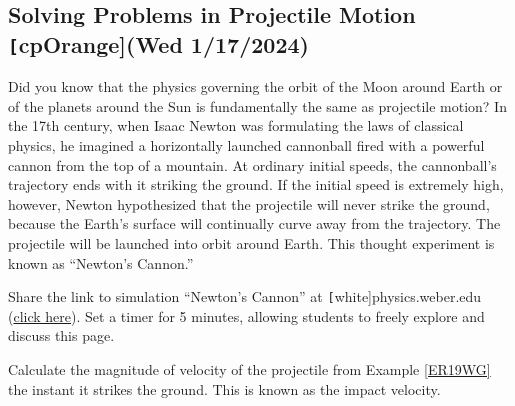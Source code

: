 \documentclass[main-physics.tex]{subfiles}
\begin{document}
\begin{center}
\end{center}

\subsection{Solving Problems in Projectile Motion \texttt[cpOrange]{(Wed 1/17/2024)}} \label{HNMVFe}

\begin{hook}
    Did you know that the physics governing the orbit of the Moon around Earth or of the planets around the Sun is fundamentally the same as projectile motion? In the 17th century, when Isaac Newton was formulating the laws of classical physics, he imagined a horizontally launched cannonball fired with a powerful cannon from the top of a mountain. At ordinary initial speeds, the cannonball's trajectory ends with it striking the ground. If the initial speed is extremely high, however, Newton hypothesized that the projectile will never strike the ground, because the Earth's surface will continually curve away from the trajectory. The projectile will be launched into orbit around Earth. This thought experiment is known as ``Newton's Cannon.''
\end{hook}

\begin{warmup}
    Share the link to simulation ``Newton's Cannon'' at \texttt[white]{physics.weber.edu} (\href{https://physics.weber.edu/schroeder/software/NewtonsCannon.html}{click here}). Set a timer for 5 minutes, allowing students to freely explore and discuss this page.
\end{warmup}

\begin{example}
    Calculate the magnitude of velocity of the projectile from Example \ref{ER19WG} the instant it strikes the ground. This is known as the impact velocity.
\end{example}
\end{document}
